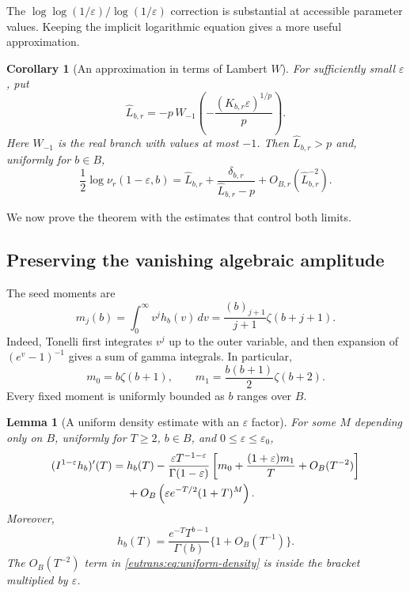 \documentclass[11pt,a4paper]{article}
\numberwithin{equation}{section}
\newtheorem{lemma}[theorem]{Lemma}
\newtheorem{corollary}[theorem]{Corollary}
\theoremstyle{definition}
\theoremstyle{remark}
\begin{document}
The $\log\log(1/\varepsilon)/\log(1/\varepsilon)$ correction is
substantial at accessible parameter values. Keeping the implicit
logarithmic equation gives a more useful approximation.

\begin{corollary}[An approximation in terms of Lambert $W$]
\label{eutrans:cor:lambert}
For sufficiently small $\varepsilon$, put
\begin{equation}\label{eutrans:eq:Lambert}
 \widehat L_{b,r}=-p\,W_{-1}\left(
             -\frac{(K_{b,r}\varepsilon)^{1/p}}p\right).
\end{equation}
Here $W_{-1}$ is the real branch with values at most $-1$.
Then $\widehat L_{b,r}>p$ and, uniformly for $b\in B$,
\begin{equation}\label{eutrans:eq:Lambert-correction}
 \frac12\log\nu_r(1-\varepsilon,b)
 =\widehat L_{b,r}+
       \frac{\delta_{b,r}}{\widehat L_{b,r}-p}
       +O_{B,r}(\widehat L_{b,r}^{-2}).
\end{equation}
\end{corollary}

We now prove the theorem with the estimates that control both limits.

\subsection{Preserving the vanishing algebraic amplitude}

The seed moments are
\begin{equation}\label{eutrans:eq:moments}
 m_j(b)=\int_0^\infty v^j h_b(v)\,dv
       =\frac{(b)_{j+1}}{j+1}\zeta(b+j+1).
\end{equation}
Indeed, Tonelli first integrates $v^j$ up to the outer variable, and
then expansion of $(e^v-1)^{-1}$ gives a sum of gamma integrals. In
particular,
\[
 m_0=b\zeta(b+1),\qquad
 m_1=\frac{b(b+1)}2\zeta(b+2).
\]
Every fixed moment is uniformly bounded as $b$ ranges over $B$.

\begin{lemma}[A uniform density estimate with an $\varepsilon$ factor]
\label{eutrans:lem:density}
For some $M$ depending only on $B$, uniformly for $T\geq2$,
$b\in B$, and $0\leq\varepsilon\leq\varepsilon_0$,
\begin{align}
 (I^{1-\varepsilon}h_b)'(T)
 ={}&h_b(T)-\frac{\varepsilon T^{-1-\varepsilon}}
                  {\Gamma(1-\varepsilon)}
       \left[m_0+\frac{(1+\varepsilon)m_1}{T}
                    +O_B(T^{-2})\right]\notag\\
 &+O_B\left(\varepsilon e^{-T/2}(1+T)^M\right).
 \label{eutrans:eq:uniform-density}
\end{align}
Moreover,
\begin{equation}\label{eutrans:eq:h-infty}
 h_b(T)=\frac{e^{-T}T^{b-1}}{\Gamma(b)}
                   \{1+O_B(T^{-1})\}.
\end{equation}
The $O_B(T^{-2})$ term in \eqref{eutrans:eq:uniform-density} is
inside the bracket multiplied by $\varepsilon$.
\end{lemma}
\end{document}
